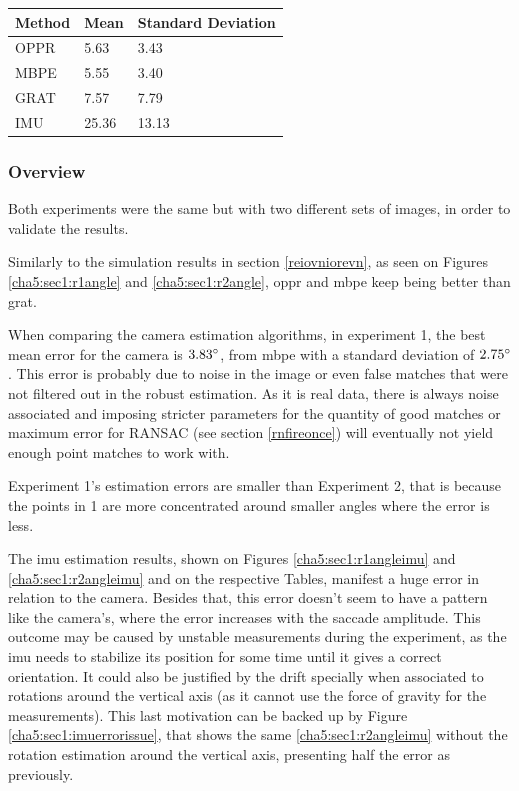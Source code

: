 \begin{table}
	\centering
	\begin{tabular}{| l | l | l |}
		\hline
		Method & Mean & Standard Deviation \\
		\hline
		OPPR &  5.63 \degree & 3.43 \degree \\
		\hline
		MBPE &  5.55 \degree & 3.40 \degree \\
		\hline
		GRAT &  7.57 \degree & 7.79 \degree \\ 
		\hline
		IMU &  25.36 \degree & 13.13 \degree \\ 
		\hline
	\end{tabular}
	\label{cha5:sec1:r2anglet}
\end{table}

\subsubsection{Overview}

Both experiments were the same but with two different sets of images, in order to validate the results.

Similarly to the simulation results in section \ref{reiovniorevn}, as seen on Figures \ref{cha5:sec1:r1angle} and \ref{cha5:sec1:r2angle}, \acrshort{oppr} and \acrshort{mbpe} keep being better than \acrshort{grat}.

When comparing the camera estimation algorithms, in experiment 1, the best mean error for the camera is $3.83 \degree $, from \acrshort{mbpe} with a standard deviation of $2.75 \degree$. This error is probably due to noise in the image or even false matches that were not filtered out in the robust estimation. As it is real data, there is always noise associated and imposing stricter parameters for the quantity of good matches or maximum error for RANSAC (see section \ref{rnfireonce}) will eventually not yield enough point matches to work with.

Experiment 1's estimation errors are smaller than Experiment 2, that is because the points in 1 are more concentrated around smaller angles where the error is less.

The \acrshort{imu} estimation results, shown on Figures \ref{cha5:sec1:r1angleimu} and \ref{cha5:sec1:r2angleimu} and on the respective Tables, manifest a huge error in relation to the camera. Besides that, this error doesn't seem to have a pattern like the camera's, where the error increases with the saccade amplitude. This outcome may be caused by unstable measurements during the experiment, as the \acrshort{imu} needs to stabilize its position for some time until it gives a correct orientation. It could also be justified by the drift specially when associated to rotations around the vertical axis (as it cannot use the force of gravity for the measurements). This last motivation can be backed up by Figure \ref{cha5:sec1:imuerrorissue}, that shows the same \ref{cha5:sec1:r2angleimu} without the rotation estimation around the vertical axis, presenting half the error as previously.


